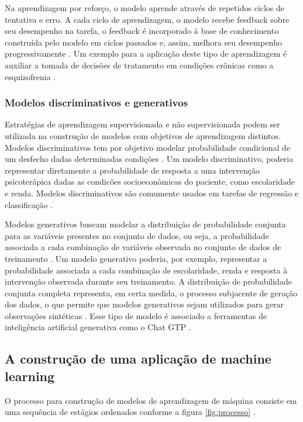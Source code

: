 Na aprendizagem por reforço, o modelo aprende através de repetidos ciclos de tentativa e erro. A cada ciclo de aprendizagem, o modelo recebe feedback sobre seu
desempenho na tarefa, o feedback é incorporado à base de conhecimento construída pelo modelo em ciclos passados e, assim, melhora seu desempenho progressivamente
\cite{Theobald2021, Bi2019}. Um exemplo para a aplicação deste tipo de aprendizagem é auxiliar a tomada de decisões de tratamento em condições crônicas como a
esquizofrenia \cite{Shortreed2010}.

\subsubsection{Modelos discriminativos e generativos}

Estratégias de aprendizagem supervisionada e não supervisionada podem ser utilizada na construção de modelos com objetivos de aprendizagem distintos. Modelos
discriminativos tem por objetivo modelar probabilidade condicional de um desfecho dadas determinadas condições \cite{Bi2019, Ng2001}. Um modelo discriminativo,
poderia representar diretamente a probabilidade de resposta a uma intervenção psicoterápica dadas as condicões socioeconômicas do paciente, como escolaridade e
renda. Modelos discriminativos são comumente usados em tarefas de regressão e classificação \cite{Bi2019}.

Modelos generativos buscam modelar a distribuição de probabilidade conjunta para as variáveis presentes no conjunto de dados, ou seja, a probabilidade associada
a cada combinação de variáveis observada no conjunto de dados de treinamento \cite{Bi2019, Ng2001}. Um modelo generativo poderia, por exemplo, representar a
probabilidade associada a cada combinação de escolaridade, renda e resposta à intervenção observada durante seu treinamento. A distribuição de probabilidade
conjunta completa representa, em certa medida, o processo subjacente de geração dos dados, o que permite que modelos generativos sejam utilizados para gerar
observações sintéticas \cite{Bi2019}. Esse tipo de modelo é associado a ferramentas de inteligência artificial generativa como o Chat GTP \cite{Wu2023}.

\subsection{A construção de uma aplicação de machine learning}

O processo para construção de modelos de aprendizagem de máquina consiste em uma sequência de estágios ordenados conforme a figura \ref{fig:processo} \cite{Greener2021}.

